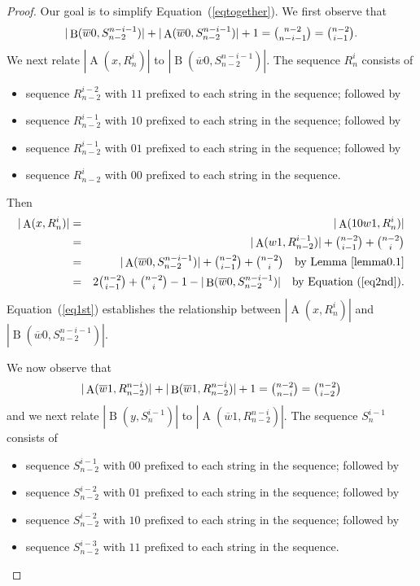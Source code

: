 \documentclass[12pt]{article}
\DeclareMathOperator{\Succ}{A}
\DeclareMathOperator{\Prec}{B}
\begin{document}
\begin{proof}
Our goal is to simplify Equation~(\ref{eqtogether}).  We first observe that \begin{equation}\label{eq2nd} |\Prec(\overline{w}0,S_{n-2}^{n-i-1})|+|\Succ(\overline{w}0,S_{n-2}^{n-i-1})|+1 = \tbinom{n-2}{n-i-1} = \tbinom{n-2}{i-1}.\end{equation}
We next relate $|\Succ(x,R_{n}^i)|$ to $|\Prec(\overline{w}0,S_{n-2}^{n-i-1})|$.  The sequence $R_{n}^i$ consists of \begin{itemize}
\item sequence $R_{n-2}^{i-2}$ with $11$ prefixed to each string in the sequence; followed by\vspace{-0.1in}
\item sequence $R_{n-2}^{i-1}$ with $10$ prefixed to each string in the sequence; followed by\vspace{-0.1in}
\item sequence $R_{n-2}^{i-1}$ with $01$ prefixed to each string in the sequence; followed by\vspace{-0.1in}
\item sequence $R_{n-2}^i$ with $00$ prefixed to each string in the sequence.
\end{itemize}
Then \begin{eqnarray} |\Succ(x,R_{n}^i)| &=& |\Succ(10w1,R_{n}^i)| \nonumber \\ &=& |\Succ(w1,R_{n-2}^{i-1})|+\tbinom{n-2}{i-1}+\tbinom{n-2}{i} \nonumber\\ 
&=& |\Succ(\overline{w}0,S_{n-2}^{n-i-1})|+\tbinom{n-2}{i-1}+\tbinom{n-2}{i} ~~~\text{by Lemma~\ref{lemma0.1}}\nonumber \\ &=& 2\tbinom{n-2}{i-1}+\tbinom{n-2}{i}-1-|\Prec(\overline{w}0,S_{n-2}^{n-i-1})| ~~~\text{by Equation~(\ref{eq2nd}).}\label{eq1st}\end{eqnarray}  Equation~(\ref{eq1st}) establishes the relationship between $|\Succ(x,R_{n}^i)|$ and $|\Prec(\overline{w}0,S_{n-2}^{n-i-1})|$.  



We now observe that \begin{equation} |\Succ(\overline{w}1,R_{n-2}^{n-i})|+|\Prec(\overline{w}1,R_{n-2}^{n-i})|+1 = \tbinom{n-2}{n-i} = \tbinom{n-2}{i-2}\label{eqzz} \end{equation} and we next relate $|\Prec(y,S_{n}^{i-1})|$ to $|\Succ(\overline{w}1,R_{n-2}^{n-i})|$. The sequence $S_{n}^{i-1}$ consists of \begin{itemize}
\item sequence $S_{n-2}^{i-1}$ with $00$ prefixed to each string in the sequence; followed by\vspace{-0.1in}
\item sequence $S_{n-2}^{i-2}$ with $01$ prefixed to each string in the sequence; followed by\vspace{-0.1in}
\item sequence $S_{n-2}^{i-2}$ with $10$ prefixed to each string in the sequence; followed by\vspace{-0.1in}
\item sequence $S_{n-2}^{i-3}$ with $11$ prefixed to each string in the sequence.
\end{itemize}


\end{proof}
\end{document}
